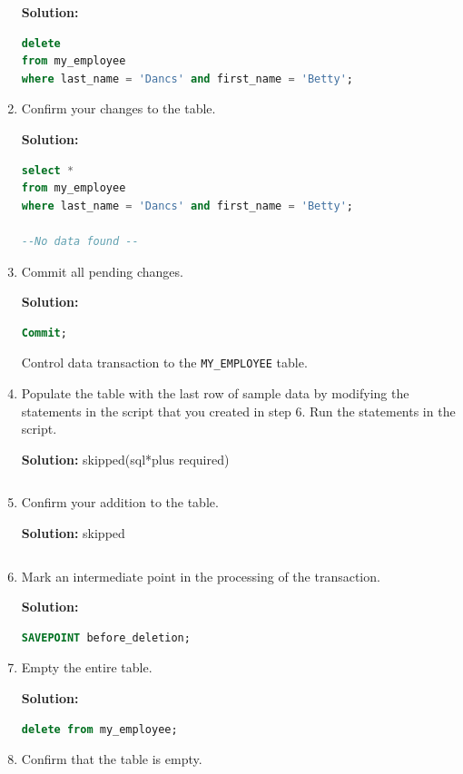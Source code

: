 \begin{enumerate}
    \textbf{Solution: }
    \begin{lstlisting}[language=SQL]
delete
from my_employee
where last_name = 'Dancs' and first_name = 'Betty';
    \end{lstlisting} 
    \item  Confirm your changes to the table.
    
    \textbf{Solution: }
    \begin{lstlisting}[language=SQL]
select * 
from my_employee 
where last_name = 'Dancs' and first_name = 'Betty';

--No data found --
    \end{lstlisting} 
    \item  Commit all pending changes.
    
    \textbf{Solution: }
    \begin{lstlisting}[language=SQL]
Commit;
    \end{lstlisting}  
Control data transaction to the \texttt{MY\_EMPLOYEE} table.
    \item Populate the table with the last row of sample data by modifying the statements in the script that you
created in step 6. Run the statements in the script.
    
    \textbf{Solution: }skipped(sql*plus required)
    \begin{lstlisting}[language=SQL]
    \end{lstlisting}  
    \item Confirm your addition to the table.
    
    \textbf{Solution: }skipped
    \begin{lstlisting}[language=SQL]
    \end{lstlisting} 
    \item Mark an intermediate point in the processing of the transaction.
    
    \textbf{Solution: }
    \begin{lstlisting}[language=SQL]
SAVEPOINT before_deletion;
    \end{lstlisting}
    \item Empty the entire table.
    
    \textbf{Solution: }
    \begin{lstlisting}[language=SQL]
delete from my_employee;
    \end{lstlisting}
    \item Confirm that the table is empty.
    

\end{enumerate}
